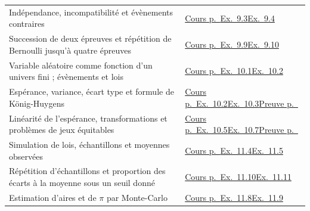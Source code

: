 \begin{longtable}{@{}p{101mm}p{58mm}@{}}
Indépendance, incompatibilité et évènements contraires & \hyperref[ess-9]{Cours p.~\pageref*{ess-9}}\newline \hyperref[exo-9-3]{Ex.~9.3}\newline \hyperref[exo-9-4]{Ex.~9.4}\\[2.3mm]
Succession de deux épreuves et répétition de Bernoulli jusqu'à quatre épreuves & \hyperref[ess-9]{Cours p.~\pageref*{ess-9}}\newline \hyperref[exo-9-9]{Ex.~9.9}\newline \hyperref[exo-9-10]{Ex.~9.10}\\[2.3mm]
Variable aléatoire comme fonction d'un univers fini ; évènements et lois & \hyperref[ess-10]{Cours p.~\pageref*{ess-10}}\newline \hyperref[exo-10-1]{Ex.~10.1}\newline \hyperref[exo-10-2]{Ex.~10.2}\\[2.3mm]
Espérance, variance, écart type et formule de König-Huygens & \hyperref[ess-10]{Cours p.~\pageref*{ess-10}}\newline \hyperref[exo-10-2]{Ex.~10.2}\newline \hyperref[exo-10-3]{Ex.~10.3}\newline \hyperref[dem-probabilites]{Preuve p.~\pageref*{dem-probabilites}}\\[2.3mm]
Linéarité de l'espérance, transformations et problèmes de jeux équitables & \hyperref[ess-10]{Cours p.~\pageref*{ess-10}}\newline \hyperref[exo-10-5]{Ex.~10.5}\newline \hyperref[exo-10-7]{Ex.~10.7}\newline \hyperref[dem-probabilites]{Preuve p.~\pageref*{dem-probabilites}}\\[2.3mm]
Simulation de lois, échantillons et moyennes observées & \hyperref[ess-11]{Cours p.~\pageref*{ess-11}}\newline \hyperref[exo-11-4]{Ex.~11.4}\newline \hyperref[exo-11-5]{Ex.~11.5}\\[2.3mm]
Répétition d'échantillons et proportion des écarts à la moyenne sous un seuil donné & \hyperref[ess-11]{Cours p.~\pageref*{ess-11}}\newline \hyperref[exo-11-10]{Ex.~11.10}\newline \hyperref[exo-11-11]{Ex.~11.11}\\[2.3mm]
Estimation d'aires et de $\pi$ par Monte-Carlo & \hyperref[ess-11]{Cours p.~\pageref*{ess-11}}\newline \hyperref[exo-11-8]{Ex.~11.8}\newline \hyperref[exo-11-9]{Ex.~11.9}\\[2.3mm]

\end{longtable}
